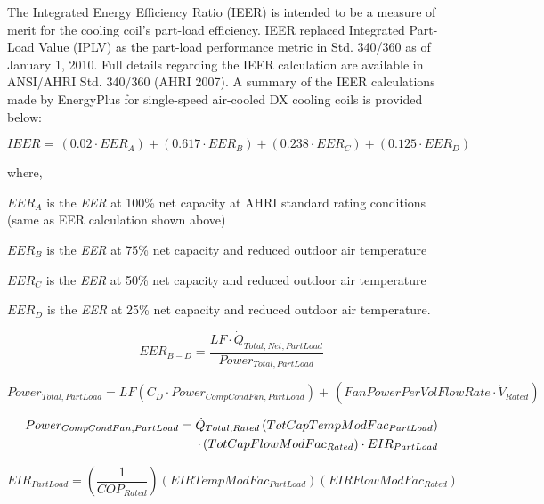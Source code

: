 The Integrated Energy Efficiency Ratio (IEER) is intended to be a measure of merit for the cooling coil's part-load efficiency. IEER replaced Integrated Part-Load Value (IPLV) as the part-load performance metric in Std. 340/360 as of January 1, 2010. Full details regarding the IEER calculation are available in ANSI/AHRI Std. 340/360 (AHRI 2007). A summary of the IEER calculations made by EnergyPlus for single-speed air-cooled DX cooling coils is provided below:

\begin{equation}
IEER = \,(0.02 \cdot EE{R_A}) + (0.617 \cdot EE{R_B}) + (0.238 \cdot EE{R_C}) + (0.125 \cdot EE{R_D})
\end{equation}

where,

\(EE{R_A}\) is the \emph{EER} at 100\% net capacity at AHRI standard rating conditions (same as EER calculation shown above)

\(EE{R_B}\) is the \emph{EER} at 75\% net capacity and reduced outdoor air temperature

\(EE{R_C}\) is the \emph{EER} at 50\% net capacity and reduced outdoor air temperature

\(EE{R_D}\) is the \emph{EER} at 25\% net capacity and reduced outdoor air temperature.

\begin{equation}
EE{R_{B - D}} = \frac{{LF \cdot {{\dot Q}_{Total,Net,PartLoad}}}}{{Powe{r_{Total, PartLoad}}}}
\end{equation}

\begin{equation}
Powe{r_{Total, PartLoad}} = LF\left( {{C_D} \cdot Powe{r_{CompCondFan, PartLoad}}} \right) + \,\left( {FanPowerPerVolFlowRate \cdot {{\dot V}_{Rated}}} \right)
\end{equation}

\begin{equation}
\begin{split}
Power_{CompCondFan,PartLoad} = \dot{Q}_{Total,Rated}\left(TotCapTempModFac_{PartLoad}\right) \\
\cdot \left(TotCapFlowModFac_{Rated}\right) \cdot EIR_{PartLoad}
\end{split}
\end{equation}

\begin{equation}
EI{R_{PartLoad}} = \left( {\frac{1}{{CO{P_{Rated}}}}} \right)(EIRTempModFa{c_{PartLoad}})(EIRFlowModFa{c_{Rated}})
\end{equation}

